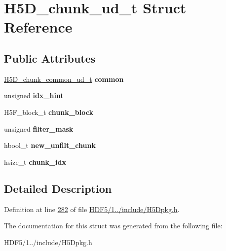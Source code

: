 \hypertarget{struct_h5_d__chunk__ud__t}{}\section{H5\+D\+\_\+chunk\+\_\+ud\+\_\+t Struct Reference}
\label{struct_h5_d__chunk__ud__t}
\subsection*{Public Attributes}
\begin{DoxyCompactItemize}
\item 
\mbox{\label{struct_h5_d__chunk__ud__t_aa8dca5564463b186367e2117b1cc7874}} 
\hyperlink{struct_h5_d__chunk__common__ud__t}{H5\+D\+\_\+chunk\+\_\+common\+\_\+ud\+\_\+t} {\bfseries common}
\item 
\mbox{\label{struct_h5_d__chunk__ud__t_a3417586c307b7a082c77ceef4f6b2f8f}} 
unsigned {\bfseries idx\+\_\+hint}
\item 
\mbox{\label{struct_h5_d__chunk__ud__t_a9469ad2a90e951ee33678c9fb07c9017}} 
H5\+F\+\_\+block\+\_\+t {\bfseries chunk\+\_\+block}
\item 
\mbox{\label{struct_h5_d__chunk__ud__t_a7a7265d4a2100ae7f262b2f2a403ea83}} 
unsigned {\bfseries filter\+\_\+mask}
\item 
\mbox{\label{struct_h5_d__chunk__ud__t_ab9df920935cf4a3d3b095c640e819823}} 
hbool\+\_\+t {\bfseries new\+\_\+unfilt\+\_\+chunk}
\item 
\mbox{\label{struct_h5_d__chunk__ud__t_a878ff8068ca645f43f41d37bb2b84ba7}} 
hsize\+\_\+t {\bfseries chunk\+\_\+idx}
\end{DoxyCompactItemize}


\subsection{Detailed Description}


Definition at line \hyperlink{_h_d_f5_21_810_81_2include_2_h5_dpkg_8h_source_l00282}{282} of file \hyperlink{_h_d_f5_21_810_81_2include_2_h5_dpkg_8h_source}{H\+D\+F5/1../include/\+H5\+Dpkg.\+h}.



The documentation for this struct was generated from the following file\+:\begin{DoxyCompactItemize}
\item 
H\+D\+F5/1../include/\+H5\+Dpkg.\+h\end{DoxyCompactItemize}
